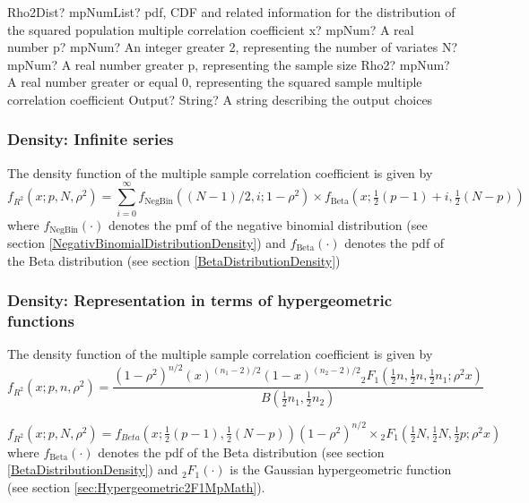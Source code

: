 \begin{mpFunctionsExtract}
	\mpFunctionFiveNotImplemented
	{Rho2Dist? mpNumList? pdf, CDF and related information for the distribution of the squared population multiple correlation coefficient}
	{x? mpNum? A real number}
	{p? mpNum? An integer greater 2, representing the number of variates}
	{N? mpNum? A real number greater p, representing the sample size}
	{Rho2? mpNum? A real number greater or equal 0, representing the squared sample multiple correlation coefficient}
	{Output? String? A string describing the output choices}
\end{mpFunctionsExtract}



\subsubsection{Density: Infinite series}
\label{Rho2DistributionDensity}

The density function of the multiple sample correlation coefficient is given by \citep{Ding_1996,Benton_2003}
\begin{equation}
	f_{R^2}(x;p,N,\rho^2) = \sum_{i=0}^\infty f_{\text{NegBin}}\left((N-1)/2, i; 1-\rho^2\right) \times f_{\text{Beta}}\left(x; \tfrac{1}{2}(p-1) + i, \tfrac{1}{2}(N-p)\right)
\end{equation}
where $f_{\text{NegBin}}(\cdot)$ denotes the pmf of the negative binomial distribution (see section \ref{NegativBinomialDistributionDensity}) and $f_{\text{Beta}}(\cdot)$ denotes the pdf of the Beta distribution (see section \ref{BetaDistributionDensity})


\subsubsection{Density: Representation in terms of hypergeometric functions}
The density function of the multiple sample correlation coefficient is given by \citep{lee_results_1971,gurland_1968}
\begin{equation}
	f_{R^2}(x;p,n,\rho^2) = \frac{(1-\rho^2)^{n/2} (x)^{(n_1-2)/2} (1-x)^{(n_2-2)/2} {}_2F_1(\tfrac{1}{2}n, \tfrac{1}{2}n, \tfrac{1}{2}n_1; \rho^2 x)}{B(\tfrac{1}{2}n_1,\tfrac{1}{2}n_2 )}
\end{equation}

\begin{equation}
	f_{R^2}(x;p,N,\rho^2) = f_{Beta}\left(x; \tfrac{1}{2}(p-1), \tfrac{1}{2}(N-p)\right) (1-\rho^2)^{n/2} \times {}_2F_1(\tfrac{1}{2}N, \tfrac{1}{2}N, \tfrac{1}{2}p; \rho^2 x)
\end{equation}
where $f_{\text{Beta}}(\cdot)$ denotes the pdf of the Beta distribution (see section \ref{BetaDistributionDensity}) 
and ${}_2F_1(\cdot)$ is the Gaussian hypergeometric function (see section \ref{sec:Hypergeometric2F1MpMath}).

